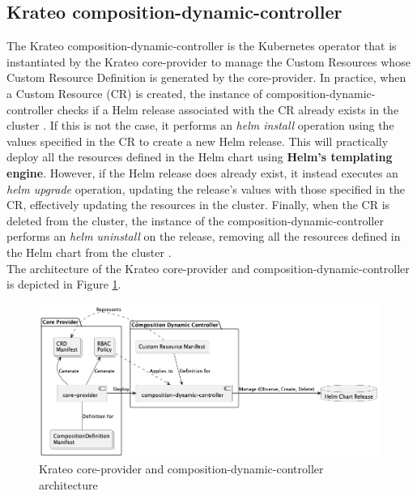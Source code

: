 \subsection{Krateo composition-dynamic-controller}

The Krateo composition-dynamic-controller is the Kubernetes operator that is instantiated by the Krateo core-provider to manage the Custom Resources whose Custom Resource Definition is generated by the core-provider.
In practice, when a Custom Resource (CR) is created, the instance of composition-dynamic-controller checks if a Helm release associated with the CR already exists in the cluster \cite{krateo_composition_dynamic_controller}. 
If this is not the case, it performs an \textit{helm install} operation using the values specified in the CR to create a new Helm release. This will practically deploy all the resources defined in the Helm chart using \textbf{Helm's templating engine}.
However, if the Helm release does already exist, it instead executes an \textit{helm upgrade} operation, updating the release's values with those specified in the CR, effectively updating the resources in the cluster.
Finally, when the CR is deleted from the cluster, the instance of the composition-dynamic-controller performs an \textit{helm uninstall} on the release, removing all the resources defined in the Helm chart from the cluster \cite{krateo_composition_dynamic_controller}. \\

The architecture of the Krateo core-provider and composition-dynamic-controller is depicted in Figure \ref{fig:krateo_core_provider}.

\begin{figure}[htb]
    \centering
    \includegraphics[width=1\linewidth]{images/kraeto_core_provider.png}
    \caption{Krateo core-provider and composition-dynamic-controller architecture \cite{krateo_core_provider}}
    \label{fig:krateo_core_provider}
\end{figure}

